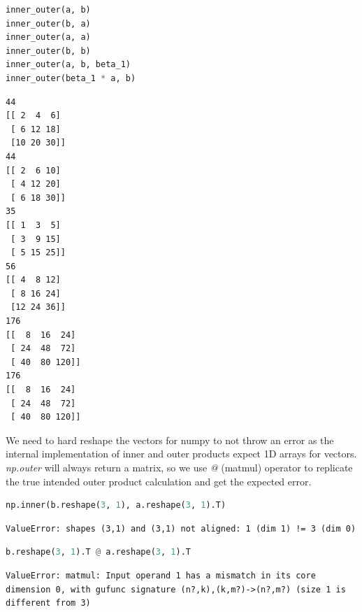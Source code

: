 \documentclass[11pt,letterpaper]{article}
\begin{document}
\begin{enumerate}
\begin{enumerate}
\begin{lstlisting}[language=python]
inner_outer(a, b)
inner_outer(b, a)
inner_outer(a, a)
inner_outer(b, b)
inner_outer(a, b, beta_1)
inner_outer(beta_1 * a, b)
\end{lstlisting}
\begin{verbatim}
44
[[ 2  4  6]
 [ 6 12 18]
 [10 20 30]]
44
[[ 2  6 10]
 [ 4 12 20]
 [ 6 18 30]]
35
[[ 1  3  5]
 [ 3  9 15]
 [ 5 15 25]]
56
[[ 4  8 12]
 [ 8 16 24]
 [12 24 36]]
176
[[  8  16  24]
 [ 24  48  72]
 [ 40  80 120]]
176
[[  8  16  24]
 [ 24  48  72]
 [ 40  80 120]]
\end{verbatim}
We need to hard reshape the vectors for numpy to not throw an error as the internal
implementation of inner and outer products expect 1D arrays for vectors. 
\textit{np.outer} will always return a matrix, so we use \textit{@} (matmul) operator
to replicate the true intended outer product calculation and get the expected error.
\begin{lstlisting}[language=python]
np.inner(b.reshape(3, 1), a.reshape(3, 1).T)
\end{lstlisting}
\begin{verbatim}
ValueError: shapes (3,1) and (3,1) not aligned: 1 (dim 1) != 3 (dim 0)
\end{verbatim}
\begin{lstlisting}[language=python]
b.reshape(3, 1).T @ a.reshape(3, 1).T
\end{lstlisting}
\begin{verbatim}
ValueError: matmul: Input operand 1 has a mismatch in its core dimension 0, with gufunc signature (n?,k),(k,m?)->(n?,m?) (size 1 is different from 3)
\end{verbatim}
\end{enumerate}
\end{enumerate}
\end{document}
